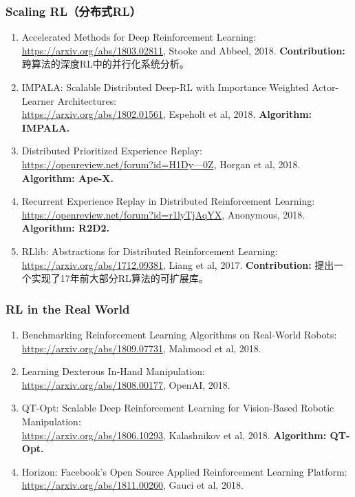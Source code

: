 \documentclass[lang=cn,11pt,a4paper]{eleganttemplate}
\begin{document}
\subsubsection{Scaling RL（分布式RL）}
\begin{enumerate}
\item Accelerated Methods for Deep Reinforcement Learning:\\ \href{https://arxiv.org/abs/1803.02811}{https://arxiv.org/abs/1803.02811}, Stooke and Abbeel, 2018. \textbf{Contribution:} 跨算法的深度RL中的并行化系统分析。
\item IMPALA: Scalable Distributed Deep-RL with Importance Weighted Actor-Learner Architectures:\\ \href{https://arxiv.org/abs/1802.01561}{https://arxiv.org/abs/1802.01561}, Espeholt et al, 2018. \textbf{Algorithm: IMPALA.}
\item Distributed Prioritized Experience Replay:\\ \href{https://openreview.net/forum?id=H1Dy---0Z}{https://openreview.net/forum?id=H1Dy---0Z}, Horgan et al, 2018. \textbf{Algorithm: Ape-X.}
\item Recurrent Experience Replay in Distributed Reinforcement Learning:\\ \href{https://openreview.net/forum?id=r1lyTjAqYX}{https://openreview.net/forum?id=r1lyTjAqYX}, Anonymous, 2018. \textbf{Algorithm: R2D2.}
\item RLlib: Abstractions for Distributed Reinforcement Learning:\\ \href{https://arxiv.org/abs/1712.09381}{https://arxiv.org/abs/1712.09381}, Liang et al, 2017. \textbf{Contribution:} 提出一个实现了17年前大部分RL算法的可扩展库。
\end{enumerate}


\subsubsection{RL in the Real World}
\begin{enumerate}
\item Benchmarking Reinforcement Learning Algorithms on Real-World Robots:\\ \href{https://arxiv.org/abs/1809.07731}{https://arxiv.org/abs/1809.07731}, Mahmood et al, 2018.
\item Learning Dexterous In-Hand Manipulation:\\ \href{https://arxiv.org/abs/1808.00177}{https://arxiv.org/abs/1808.00177}, OpenAI, 2018.
\item QT-Opt: Scalable Deep Reinforcement Learning for Vision-Based Robotic Manipulation:\\ \href{https://arxiv.org/abs/1806.10293}{https://arxiv.org/abs/1806.10293}, Kalashnikov et al, 2018. \textbf{Algorithm: QT-Opt.}
\item Horizon: Facebook’s Open Source Applied Reinforcement Learning Platform:\\ \href{https://arxiv.org/abs/1811.00260}{https://arxiv.org/abs/1811.00260}, Gauci et al, 2018.
\end{enumerate}
\end{document}
